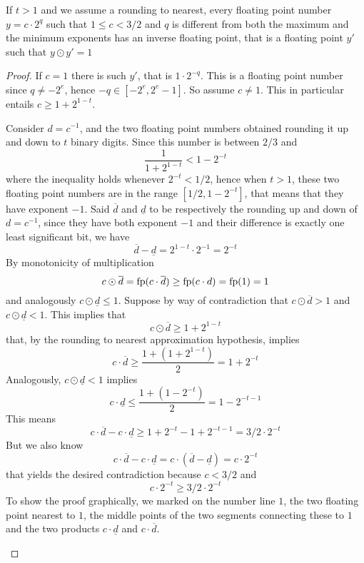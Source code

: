 \begin{prop}\label{appA:th:fp-inverse}
	If $t > 1$ and we assume a rounding to nearest, every floating point number $y = c \cdot 2^q$ such that $1 \le c < 3/2$ and $q$ is different from both the maximum and the minimum exponents has an inverse floating point, that is a floating point $y'$ such that $y \odot y' = 1$
\end{prop}
\begin{proof}
	If $c = 1$ there is such $y'$, that is $1 \cdot 2^{-q}$. This is a floating point number since $q \neq -2^e$, hence $-q \in [-2^e, 2^e - 1]$. So assume $c \neq 1$. This in particular entails $c \ge 1 + 2^{1-t}$.

	Consider $d = c^{-1}$, and the two floating point numbers obtained rounding it up and down to $t$ binary digits. Since this number is between $2/3$ and
	\[
	\frac{1}{1 + 2^{1-t}} < 1 - 2^{-t}
	\]
	where the inequality holds whenever $2^{-t} < 1/2$, hence when $t > 1$, these two floating point numbers are in the range $[1/2, 1 - 2^{-t}]$, that means that they have exponent $-1$. Said $\overline{d}$ and $\underline{d}$ to be respectively the rounding up and down of $d = c^{-1}$, since they have both exponent $-1$ and their difference is exactly one least significant bit, we have
	\[
	\overline{d} - \underline{d} = 2^{1-t} \cdot 2^{-1} = 2^{-t}
	\]
	By monotonicity of multiplication
	\[
	c \odot \overline{d} = \text{fp}(c \cdot \overline{d}) \ge \text{fp}(c \cdot d) = \text{fp}(1) = 1
	\]
	and analogously $c \odot \underline{d} \le 1$.
	Suppose by way of contradiction that $c \odot \overline{d} > 1$ and $c \odot \underline{d} < 1$. This implies that
	\[
	c \odot \overline{d} \ge 1 + 2^{1-t}
	\]
	that, by the rounding to nearest approximation hypothesis, implies
	\[
	c \cdot \overline{d} \ge \frac{1 + (1 + 2^{1-t})}{2} = 1 + 2^{-t}
	\]
	Analogously, $c \odot \underline{d} < 1$ implies
	\[
	c \cdot \underline{d} \le \frac{1 + (1 - 2^{-t})}{2} = 1 - 2^{-t-1}
	\]
	This means
	\[
	c \cdot \overline{d} - c \cdot \underline{d} \ge 1 + 2^{-t} - 1 + 2^{-t-1} = 3/2 \cdot 2^{-t}
	\]
	But we also know
	\[
	c \cdot \overline{d} - c \cdot \underline{d} = c \cdot (\overline{d} - \underline{d}) = c \cdot 2^{-t}
	\]
	that yields the desired contradiction because $c < 3/2$ and
	\[
	c \cdot 2^{-t} \ge 3 / 2 \cdot 2^{-t}
	\]
	To show the proof graphically, we marked on the number line $1$, the two floating point nearest to $1$, the middle points of the two segments connecting these to $1$ and the two products $c \cdot \underline{d}$ and $c \cdot \overline{d}$.
	\begin{center}
\end{center}
\end{proof}
